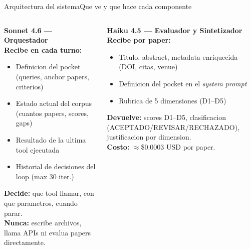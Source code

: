 \documentclass[aspectratio=169,10pt]{beamer}
\newenvironment{card}[1][cardbg]{%
  \begin{tcolorbox}[colback=#1,colframe=bidlight!40,arc=4pt,
    boxrule=0.4pt,left=5pt,right=5pt,top=4pt,bottom=4pt]}%
  {\end{tcolorbox}}
\begin{document}
\begin{frame}{Arquitectura del sistema}{Que ve y que hace cada componente}
\begin{columns}[T]

\begin{card}
\scriptsize\textbf{\color{bidaccent}Sonnet 4.6 — Orquestador}\\[3pt]
\tiny\color{bidgray}
\textbf{Recibe en cada turno:}
\begin{itemize}\setlength\itemsep{1pt}
  \item Definicion del pocket (queries, anchor papers, criterios)
  \item Estado actual del corpus (cuantos papers, scores, gaps)
  \item Resultado de la ultima tool ejecutada
  \item Historial de decisiones del loop (max 30 iter.)
\end{itemize}
\vspace{3pt}
\textbf{Decide:} que tool llamar, con que parametros, cuando parar.\\
\textbf{Nunca:} escribe archivos, llama APIs ni evalua papers directamente.
\end{card}

\vspace{3pt}
\begin{card}
\scriptsize\textbf{\color{bidaccent}Haiku 4.5 — Evaluador y Sintetizador}\\[3pt]
\tiny\color{bidgray}
\textbf{Recibe por paper:}
\begin{itemize}\setlength\itemsep{1pt}
  \item Titulo, abstract, metadata enriquecida (DOI, citas, venue)
  \item Definicion del pocket en el \emph{system prompt}
  \item Rubrica de 5 dimensiones (D1--D5)
\end{itemize}
\vspace{3pt}
\textbf{Devuelve:} scores D1--D5, clasificacion (ACEPTADO/REVISAR/RECHAZADO), justificacion por dimension.\\
\textbf{Costo:} $\approx$\$0.0003 USD por paper.
\end{card}


\end{columns}
\end{frame}
\end{document}
